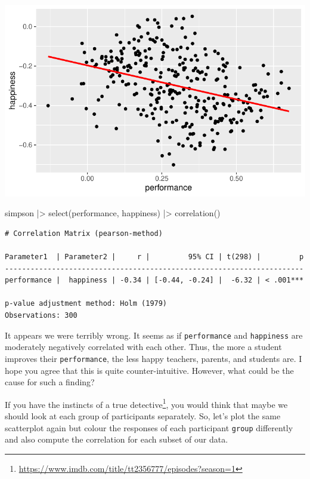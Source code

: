 \documentclass[
  letterpaper,
]{krantz}
\makeatletter
\newenvironment{Shaded}{\begin{snugshade}}{\end{snugshade}}
\newcommand{\FunctionTok}[1]{\textcolor[rgb]{0.28,0.35,0.67}{#1}}
\newcommand{\NormalTok}[1]{\textcolor[rgb]{0.00,0.23,0.31}{#1}}
\newcommand{\SpecialCharTok}[1]{\textcolor[rgb]{0.37,0.37,0.37}{#1}}
\renewcommand{\href}[2]{#2\footnote{\url{#1}}}
\newenvironment{kframe}{%
\medskip{}
\setlength{\fboxsep}{.8em}
 \def\at@end@of@kframe{}%
 \ifinner\ifhmode%
  \def\at@end@of@kframe{\end{minipage}}%
  \begin{minipage}{\columnwidth}%
 \fi\fi%
 \def\FrameCommand##1{\hskip\@totalleftmargin \hskip-\fboxsep
 \colorbox{shadecolor}{##1}\hskip-\fboxsep
     \hskip-\linewidth \hskip-\@totalleftmargin \hskip\columnwidth}%
 \MakeFramed {\advance\hsize-\width
   \@totalleftmargin\z@ \linewidth\hsize
   \@setminipage}}%
 {\par\unskip\endMakeFramed%
 \at@end@of@kframe}
\renewenvironment{Shaded}{\begin{kframe}}{\end{kframe}}
\makeatother
\begin{document}
\includegraphics{10_correlations_files/figure-pdf/simpson-paradox-plot-1.pdf}

\begin{Shaded}
\begin{Highlighting}[]
\NormalTok{simpson }\SpecialCharTok{|\textgreater{}}
  \FunctionTok{select}\NormalTok{(performance, happiness) }\SpecialCharTok{|\textgreater{}}
  \FunctionTok{correlation}\NormalTok{()}
\end{Highlighting}
\end{Shaded}

\begin{verbatim}
# Correlation Matrix (pearson-method)

Parameter1  | Parameter2 |     r |         95% CI | t(298) |         p
----------------------------------------------------------------------
performance |  happiness | -0.34 | [-0.44, -0.24] |  -6.32 | < .001***

p-value adjustment method: Holm (1979)
Observations: 300
\end{verbatim}

It appears we were terribly wrong. It seems as if \texttt{performance}
and \texttt{happiness} are moderately negatively correlated with each
other. Thus, the more a student improves their \texttt{performance}, the
less happy teachers, parents, and students are. I hope you agree that
this is quite counter-intuitive. However, what could be the cause for
such a finding?

If you have the instincts of a
\href{https://www.imdb.com/title/tt2356777/episodes?season=1}{true
detective}, you would think that maybe we should look at each group of
participants separately. So, let's plot the same scatterplot again but
colour the responses of each participant \texttt{group} differently and
also compute the correlation for each subset of our data.
\end{document}
